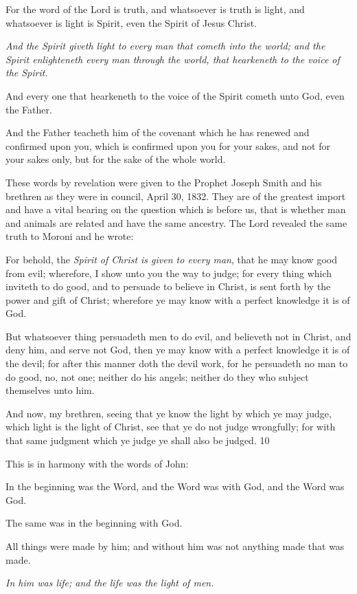 For the word of the Lord is truth, and whatsoever is truth is light, and whatsoever is light is
Spirit, even the Spirit of Jesus Christ.

\textit{And the Spirit giveth light to every man that cometh into the world; and the Spirit
enlighteneth every man through the world, that hearkeneth to the voice of the Spirit.}

And every one that hearkeneth to the voice of the Spirit cometh unto God, even the Father.

And the Father teacheth him of the covenant which he has renewed and confirmed upon you,
which is confirmed upon you for your sakes, and not for your sakes only, but for the sake of
the whole world.

These words by revelation were given to the Prophet Joseph Smith and his brethren as they
were in council, April 30, 1832. They are of the greatest import and have a vital bearing on
the question which is before us, that is whether man and animals are related and have the
same ancestry. The Lord revealed the same truth to Moroni and he wrote:

For behold, the \textit{Spirit of Christ is given to every man}, that he may know good from evil;
wherefore, I show unto you the way to judge; for every thing which inviteth to do good, and
to persuade to believe in Christ, is sent forth by the power and gift of Christ; wherefore ye
may know with a perfect knowledge it is of God.

But whatsoever thing persuadeth men to do evil, and believeth not in Christ, and deny him,
and serve not God, then ye may know with a perfect knowledge it is of the devil; for after
this manner doth the devil work, for he persuadeth no man to do good, no, not one; neither do
his angels; neither do they who subject themselves unto him.

And now, my brethren, seeing that ye know the light by which ye may judge, which light is
the light of Christ, see that ye do not judge wrongfully; for with that same judgment which ye
judge ye shall also be judged. 10

This is in harmony with the words of John:

In the beginning was the Word, and the Word was with God, and the Word was God.

The same was in the beginning with God.

All things were made by him; and without him was not anything made that was made.

\textit{In him was life; and the life was the light of men.}

